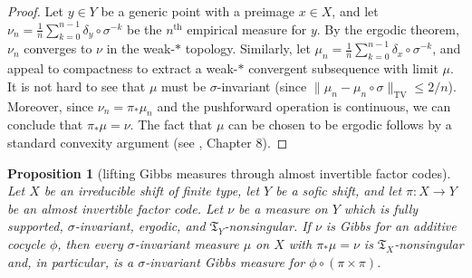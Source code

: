 \documentclass{amsproc}
\numberwithin{theorem}{section}
\newtheorem{proposition}[theorem]{Proposition}
\theoremstyle{remark}
\theoremstyle{definition}
\newcommand{\fT}{\mathfrak{T}}
\theoremstyle{plain}
\begin{document}
\begin{proof}
Let $y \in Y$ be a generic point with a preimage $x \in X$, and let $\nu_n = \frac{1}{n} \sum_{k=0}^{n-1} \delta_y \circ \sigma^{-k}$ be the $n^{\text{th}}$ empirical measure for $y$. By the ergodic theorem, $\nu_n$ converges to $\nu$ in the weak-$*$ topology. Similarly, let $\mu_n = \frac{1}{n} \sum_{k=0}^{n-1} \delta_x \circ \sigma^{-k}$, and appeal to compactness to extract a weak-$*$ convergent subsequence with limit $\mu$. It is not hard to see that $\mu$ must be $\sigma$-invariant (since $\| \mu_n - \mu_n \circ \sigma   \|_{\mathrm{TV}} \leq 2/n$). Moreover, since $\nu_n = \pi_* \mu_n$ and the pushforward operation is continuous, we can conclude that $\pi_* \mu = \nu$. The fact that $\mu$ can be chosen to be ergodic follows by a standard convexity argument (see \cite{simon2011convexity}, Chapter 8).
\end{proof}

\begin{proposition}[lifting Gibbs measures through almost invertible factor codes]\label{sofic-gibbs-pushfwd}
Let $X$ be an irreducible shift of finite type, let $Y$ be a sofic shift, and let $\pi: X \to Y$ be an almost invertible factor code. Let $\nu$ be a measure on $Y$ which is fully supported, $\sigma$-invariant, ergodic, and $\fT_Y$-nonsingular. If $\nu$ is Gibbs for an additive cocycle $\phi$, then every $\sigma$-invariant measure $\mu$ on $X$ with $\pi_* \mu = \nu$ is  $\fT_X$-nonsingular and, in particular, is a $\sigma$-invariant Gibbs measure for $\phi \circ (\pi \times \pi)$.
\end{proposition}
\end{document}
